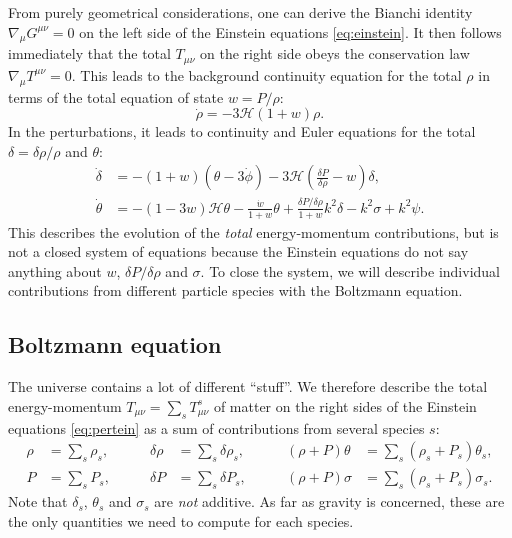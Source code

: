 \documentclass[USenglish, thumbmarks]{uiophdthesis} %
\newcommand\calH{\mathcal{H}}
\begin{document}
From purely geometrical considerations,
one can derive the Bianchi identity $\nabla_\mu G^{\mu\nu} = 0$ on the left side of the Einstein equations \eqref{eq:einstein}.
It then follows immediately that the total $T_{\mu\nu}$ on the right side obeys the conservation law $\nabla_\mu T^{\mu\nu} = 0$.
This leads to the background continuity equation for the total $\rho$
in terms of the total equation of state $w = P/\rho$:
\begin{equation}
\dot{\rho} = -3\calH(1+w) \rho.
\label{eq:bg_cont}
\end{equation}
In the perturbations, it leads to continuity and Euler equations for the total $\delta=\delta\rho/\rho$ and $\theta$:
\begin{subequations}
\label{eq:pert_fluid}
\begin{align}
\dot{\delta} &= -(1+w)(\theta-3\dot{\phi}) - 3\calH \left( \frac{\delta P}{\delta \rho} - w \right) \delta, \label{eq:pert_cont} \\
\dot{\theta} &= -(1-3w)\calH\theta - \frac{\dot{w}}{1+w}\theta + \frac{\delta P/\delta \rho}{1+w}k^2\delta - k^2\sigma + k^2 \psi. \label{eq:pert_euler}
\end{align}
\end{subequations}
This describes the evolution of the \emph{total} energy-momentum contributions,
but is not a closed system of equations because the Einstein equations do not say anything about $w$, $\delta P/\delta\rho$ and $\sigma$.
To close the system,
we will describe individual contributions from different particle species with the Boltzmann equation.

\subsection{Boltzmann equation}
\label{sec:boltzmann}

The universe contains a lot of different \enquote{stuff}.
We therefore describe the total energy-momentum $T_{\mu\nu} = \sum_s T_{\mu\nu}^s$ of matter
on the right sides of the Einstein equations \eqref{eq:pertein}
as a sum of contributions from several species $s$:
\begin{equation}
\label{eq:totalT}
\begin{aligned}
\rho &= \sum_s \rho_s, \qquad &
\delta\rho &= \sum_s \delta\rho_s, \qquad &
(\rho+P)\theta &= \sum_s (\rho_s+P_s)\theta_s, \\
P &= \sum_s P_s, \qquad &
\delta P &= \sum_s \delta P_s, \qquad &
(\rho+P)\sigma &= \sum_s (\rho_s+P_s)\sigma_s .
\end{aligned}
\end{equation}
Note that $\delta_s$, $\theta_s$ and $\sigma_s$ are \emph{not} additive.
As far as gravity is concerned,
these are the only quantities we need to compute for each species.
\end{document}
